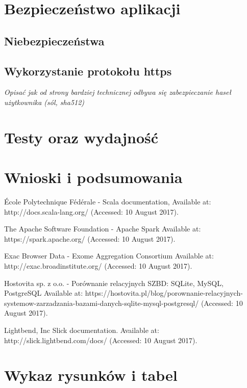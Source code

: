 \documentclass[a4paper,12pt,twoside]{article}
\begin{document}
\section{Bezpieczeństwo aplikacji}  
\subsection{Niebezpieczeństwa}
\subsection{Wykorzystanie protokołu https}
\textit{Opisać jak od strony bardziej technicznej odbywa się zabezpieczanie haseł użytkownika (sól, sha512) }
\newpage
\section{Testy oraz wydajność}  
\newpage
\section{Wnioski i podsumowania}  

\newpage
\begin{thebibliography}{99}

École Polytechnique Fédérale - Scala documentation,
Available at: http://docs.scala-lang.org/ (Accessed: 10 August 2017).

The Apache Software Foundation - Apache Spark Available at: https://spark.apache.org/ (Accessed: 10 August 2017).

Exac Browser Data - Exome Aggregation Consortium  
Available at: http://exac.broadinstitute.org/ (Accessed: 10 August 2017).

Hostovita sp. z o.o. - Porównanie relacyjnych SZBD: SQLite, MySQL, PostgreSQL
Available at:
https://hostovita.pl/blog/porownanie-relacyjnych-systemow-zarzadzania-bazami-danych-sqlite-mysql-postgresql/ (Accessed: 10 August 2017).

Lightbend, Inc Slick documentation. Available at:
http://slick.lightbend.com/docs/ (Accessed: 10 August 2017).
\end{thebibliography}

\newpage
\section*{Wykaz rysunków i tabel} 
\end{document}
